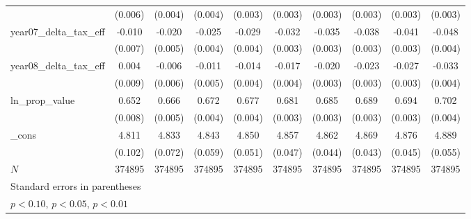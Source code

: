{\begin{tabular}{l*{9}{c}}
            &     (0.006)         &     (0.004)         &     (0.004)         &     (0.003)         &     (0.003)         &     (0.003)         &     (0.003)         &     (0.003)         &     (0.003)         \\
[1em]
year07_delta_tax_eff&      -0.010         &      -0.020\sym{***}&      -0.025\sym{***}&      -0.029\sym{***}&      -0.032\sym{***}&      -0.035\sym{***}&      -0.038\sym{***}&      -0.041\sym{***}&      -0.048\sym{***}\\
            &     (0.007)         &     (0.005)         &     (0.004)         &     (0.004)         &     (0.003)         &     (0.003)         &     (0.003)         &     (0.003)         &     (0.004)         \\
[1em]
year08_delta_tax_eff&       0.004         &      -0.006         &      -0.011\sym{**} &      -0.014\sym{***}&      -0.017\sym{***}&      -0.020\sym{***}&      -0.023\sym{***}&      -0.027\sym{***}&      -0.033\sym{***}\\
            &     (0.009)         &     (0.006)         &     (0.005)         &     (0.004)         &     (0.004)         &     (0.003)         &     (0.003)         &     (0.003)         &     (0.004)         \\
[1em]
ln_prop_value&       0.652\sym{***}&       0.666\sym{***}&       0.672\sym{***}&       0.677\sym{***}&       0.681\sym{***}&       0.685\sym{***}&       0.689\sym{***}&       0.694\sym{***}&       0.702\sym{***}\\
            &     (0.008)         &     (0.005)         &     (0.004)         &     (0.004)         &     (0.003)         &     (0.003)         &     (0.003)         &     (0.003)         &     (0.004)         \\
[1em]
_cons       &       4.811\sym{***}&       4.833\sym{***}&       4.843\sym{***}&       4.850\sym{***}&       4.857\sym{***}&       4.862\sym{***}&       4.869\sym{***}&       4.876\sym{***}&       4.889\sym{***}\\
            &     (0.102)         &     (0.072)         &     (0.059)         &     (0.051)         &     (0.047)         &     (0.044)         &     (0.043)         &     (0.045)         &     (0.055)         \\
\hline
\(N\)       &      374895         &      374895         &      374895         &      374895         &      374895         &      374895         &      374895         &      374895         &      374895         \\
\hline\hline
\multicolumn{10}{p{\linewidth}}{\footnotesize Standard errors in parentheses}\\
\multicolumn{10}{p{\linewidth}}{\footnotesize \sym{*} \(p<0.10\), \sym{**} \(p<0.05\), \sym{***} \(p<0.01\)}\\
\end{tabular}
}

